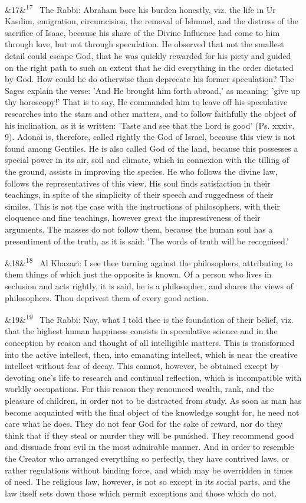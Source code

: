 \documentclass[12pt]{article}
\newcommand{\para}[1][]{\par\noindent\ifx&#1&\else\textsuperscript{\footnotesize #1}~\fi}
\begin{document}
\para[17] The Rabbi: Abraham bore his burden honestly, viz. the life in Ur Kasdim, emigration, circumcision, the removal of Ishmael, and the distress of the sacrifice of Isaac, because his share of the Divine Influence had come to him through love, but not through speculation. He observed that not the smallest detail could escape God, that he was quickly rewarded for his piety and guided on the right path to such an extent that he did everything in the order dictated by God. How could he do otherwise than deprecate his former speculation? The Sages explain the verse: 'And He brought him forth abroad,' as meaning: 'give up thy horoscopy!' That is to say, He commanded him to leave off his speculative researches into the stars and other matters, and to follow faithfully the object of his inclination, as it is written: 'Taste and see that the Lord is good' (Ps. xxxiv. 9). Adonāi is, therefore, called rightly the God of Israel, because this view is not found among Gentiles. He is also called God of the land, because this possesses a special power in its air, soil and climate, which in connexion with the tilling of the ground, assists in improving the species. He who follows the divine law, follows the representatives of this view. His soul finds satisfaction in their teachings, in spite of the simplicity of their speech and ruggedness of their similes. This is not the case with the instructions of philosophers, with their eloquence and fine teachings, however great the impressiveness of their arguments. The masses do not follow them, because the human soul has a presentiment of the truth, as it is said: 'The words of truth will be recognised.'

\para[18] Al Khazari: I see thee turning against the philosophers, attributing to them things of which just the opposite is known. Of a person who lives in seclusion and acts rightly, it is said, he is a philosopher, and shares the views of philosophers. Thou deprivest them of every good action.

\para[19] The Rabbi: Nay, what I told thee is the foundation of their belief, viz. that the highest human happiness consists in speculative science and in the conception by reason and thought of all intelligible matters. This is transformed into the active intellect, then, into emanating intellect, which is near the creative intellect without fear of decay. This cannot, however, be obtained except by devoting one's life to research and continual reflection, which is incompatible with worldly occupations. For this reason they renounced wealth, rank, and the pleasure of children, in order not to be distracted from study. As soon as man has become acquainted with the final object of the knowledge sought for, he need not care what he does. They do not fear God for the sake of reward, nor do they think that if they steal or murder they will be punished. They recommend good and dissuade from evil in the most admirable manner. And in order to resemble the Creator who arranged everything so perfectly, they have contrived laws, or rather regulations without binding force, and which may be overridden in times of need. The religious law, however, is not so except in its social parts, and the law itself sets down those which permit exceptions and those which do not.
\end{document}
